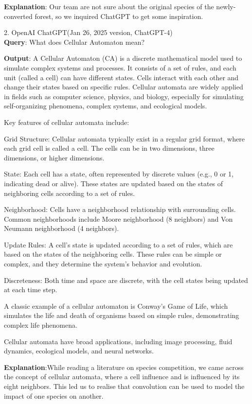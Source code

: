 \documentclass[12pt]{article}
\begin{document}
	\textbf{Explanation}: Our team are not sure about the original species of the newly-converted forest, so we inquired ChatGPT to get some inspiration.
	
	2. OpenAI ChatGPT(Jan 26, 2025 version, ChatGPT-4)\\
	\hspace{2em}\textbf{Query}: What does Cellular Automaton mean?
	
	\textbf{Output}: A Cellular Automaton (CA) is a discrete mathematical model used to simulate complex systems and processes. It consists of a set of rules, and each unit (called a cell) can have different states. Cells interact with each other and change their states based on specific rules. Cellular automata are widely applied in fields such as computer science, physics, and biology, especially for simulating self-organizing phenomena, complex systems, and ecological models.
	
	Key features of cellular automata include:
	
	Grid Structure: Cellular automata typically exist in a regular grid format, where each grid cell is called a cell. The cells can be in two dimensions, three dimensions, or higher dimensions.
	
	State: Each cell has a state, often represented by discrete values (e.g., 0 or 1, indicating dead or alive). These states are updated based on the states of neighboring cells according to a set of rules.
	
	Neighborhood: Cells have a neighborhood relationship with surrounding cells. Common neighborhoods include Moore neighborhood (8 neighbors) and Von Neumann neighborhood (4 neighbors).
	
	Update Rules: A cell's state is updated according to a set of rules, which are based on the states of the neighboring cells. These rules can be simple or complex, and they determine the system's behavior and evolution.
	
	Discreteness: Both time and space are discrete, with the cell states being updated at each time step.
	
	A classic example of a cellular automaton is Conway's Game of Life, which simulates the life and death of organisms based on simple rules, demonstrating complex life phenomena.
	
	Cellular automata have broad applications, including image processing, fluid dynamics, ecological models, and neural networks.
	
	\textbf{Explanation}:While reading a literature on species competition, we came across the concept of cellular automata, where a cell influence and is influenced by its eight neighbors. This led us to realise that convolution can be used to model the impact of one species on another.
	
\end{document}
